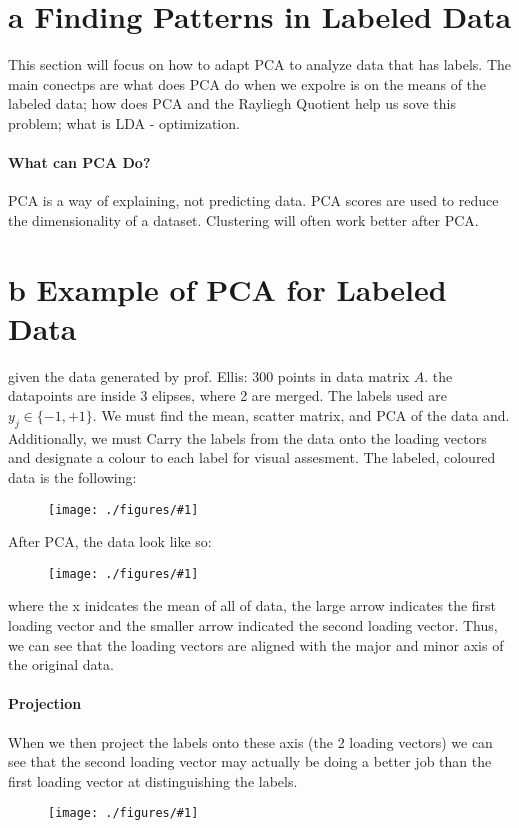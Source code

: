 \documentclass[12pt]{book}
\title{\coursetitle\linebreak\lecturename}
\author{\\Cain Susko\\ 
           \\ \\ \\
      Queen's University 
    \\School of Computing\\}
\newcommand{\incimg}[2]{%
       \begin{figure}[h]
               \centering
               \texttt{[image: ./figures/\#1]}
       \end{figure}
}
\begin{document}
\begin{titlepage}
        \maketitle
\end{titlepage}


\section*{a Finding Patterns in Labeled Data}
This section will focus on how to adapt PCA to analyze data that has labels. The main conectps are
what does PCA do when we expolre is on the means of the labeled data; how does PCA and the Rayliegh Quotient help us sove this problem; what is LDA - optimization.

\paragraph{What can PCA Do?}
PCA is a way of explaining, not predicting data. PCA scores are used to reduce the dimensionality
of a dataset. Clustering will often work better after PCA.

\section*{b Example of PCA for Labeled Data}
given the data generated by prof. Ellis: 300 points in data matrix $A$. the datapoints are 
inside 3 elipses, where 2 are merged. The labels used are $y_j \in \{-1, +1\}$.
We must find the mean, scatter matrix, and PCA of the data and. Additionally, we must
Carry the labels from the data onto the loading vectors and designate a colour to each 
label for visual assesment.
The labeled, coloured data is the following:
\incimg{data}{0.5}

After PCA, the data look like so:
\incimg{dataPCA}{0.5}

where the x inidcates the mean of all of data, the large arrow indicates the first loading vector
and the smaller arrow indicated the second loading vector. Thus, we can see that the loading 
vectors are aligned with the major and minor axis of the original data.

\paragraph{Projection}
When we then project the labels onto these axis (the 2 loading vectors) we can see that the second
loading vector may actually be doing a better job than the first loading vector at distinguishing 
the labels.
\incimg{project}{0.5}
\end{document}
